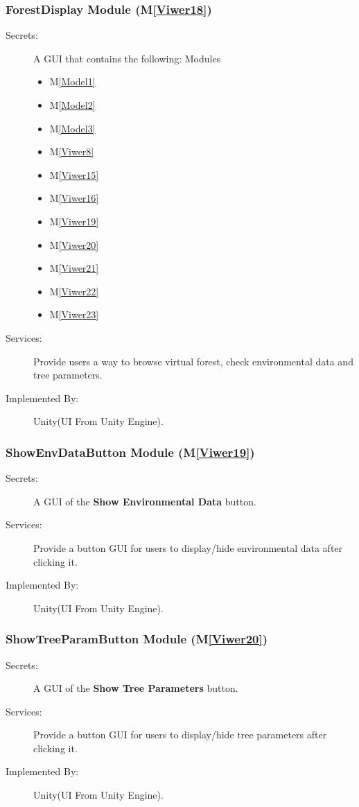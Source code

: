 \documentclass[12pt, titlepage]{article}
\newcommand{\mref}[1]{M\ref{#1}}
\newcommand{\UUI}{Unity(UI From Unity Engine).}
\begin{document}
\subsubsection{ForestDisplay Module (\mref{Viwer18})}
\begin{description}
\item[Secrets:] A GUI that contains the following: Modules
\begin{itemize}
\item \mref{Model1}
\item \mref{Model2}
\item \mref{Model3}
\item \mref{Viwer8}
\item \mref{Viwer15}
\item \mref{Viwer16}
\item \mref{Viwer19}
\item \mref{Viwer20}
\item \mref{Viwer21}
\item \mref{Viwer22}
\item \mref{Viwer23}
\end{itemize}

\item[Services:] Provide users a way to browse virtual forest, check environmental data and
tree parameters.
\item[Implemented By:] \UUI
\end{description}

\renewcommand\bt{\textbf{Show Environmental Data }}
\subsubsection{ShowEnvDataButton Module (\mref{Viwer19})}
\begin{description}
\item[Secrets:] A GUI of the \bt  button.
\item[Services:] Provide a button GUI for users to display/hide environmental data after 
clicking it.
\item[Implemented By:]\UUI
\end{description}

\renewcommand\bt{\textbf{Show Tree Parameters }}
\subsubsection{ShowTreeParamButton Module (\mref{Viwer20})}
\begin{description}
\item[Secrets:] A GUI of the \bt  button.
\item[Services:] Provide a button GUI for users to display/hide tree parameters after 
clicking it.
\item[Implemented By:]\UUI
\end{description}
\end{document}
